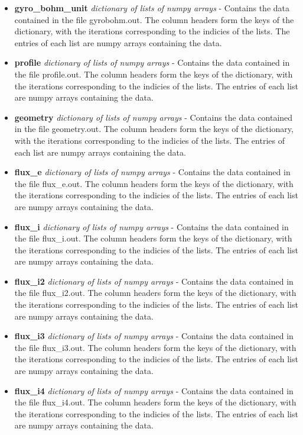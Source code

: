 \documentclass{article}
\begin{document}
\begin{itemize}
\begin{itemize}
\item \textbf{gyro\_bohm\_unit} \emph{dictionary of lists of numpy arrays} - Contains the data contained in the file gyrobohm.out.  The column headers form the keys of the dictionary, with the iterations corresponding to the indicies of the lists.  The entries of each list are numpy arrays containing the data.
\item \textbf{profile} \emph{dictionary of lists of numpy arrays} - Contains the data contained in the file profile.out.  The column headers form the keys of the dictionary, with the iterations corresponding to the indicies of the lists.  The entries of each list are numpy arrays containing the data.
\item \textbf{geometry} \emph{dictionary of lists of numpy arrays} - Contains the data contained in the file geometry.out.  The column headers form the keys of the dictionary, with the iterations corresponding to the indicies of the lists.  The entries of each list are numpy arrays containing the data.
\item \textbf{flux\_e} \emph{dictionary of lists of numpy arrays} - Contains the data contained in the file flux\_e.out.  The column headers form the keys of the dictionary, with the iterations corresponding to the indicies of the lists.  The entries of each list are numpy arrays containing the data.
\item \textbf{flux\_i} \emph{dictionary of lists of numpy arrays} - Contains the data contained in the file flux\_i.out.  The column headers form the keys of the dictionary, with the iterations corresponding to the indicies of the lists.  The entries of each list are numpy arrays containing the data.
\item \textbf{flux\_i2} \emph{dictionary of lists of numpy arrays} - Contains the data contained in the file flux\_i2.out.  The column headers form the keys of the dictionary, with the iterations corresponding to the indicies of the lists.  The entries of each list are numpy arrays containing the data.
\item \textbf{flux\_i3} \emph{dictionary of lists of numpy arrays} - Contains the data contained in the file flux\_i3.out.  The column headers form the keys of the dictionary, with the iterations corresponding to the indicies of the lists.  The entries of each list are numpy arrays containing the data.
\item \textbf{flux\_i4} \emph{dictionary of lists of numpy arrays} - Contains the data contained in the file flux\_i4.out.  The column headers form the keys of the dictionary, with the iterations corresponding to the indicies of the lists.  The entries of each list are numpy arrays containing the data.

\end{itemize}
\end{itemize}
\end{document}
